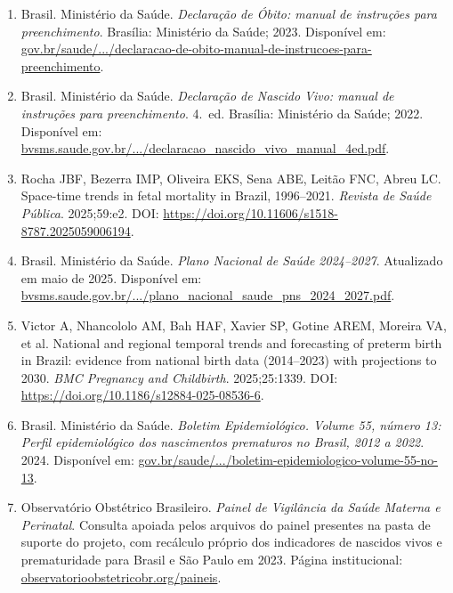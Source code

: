 \documentclass[12pt,a4paper]{article}
\begin{document}
\begin{enumerate}[leftmargin=*]
\item Brasil. Ministério da Saúde. \textit{Declaração de Óbito: manual de instruções para preenchimento}. Brasília: Ministério da Saúde; 2023. Disponível em: \href{https://www.gov.br/saude/pt-br/centrais-de-conteudo/publicacoes/svsa/vigilancia/declaracao-de-obito-manual-de-instrucoes-para-preenchimento.pdf/view}{gov.br/saude/.../declaracao-de-obito-manual-de-instrucoes-para-preenchimento}.

\item Brasil. Ministério da Saúde. \textit{Declaração de Nascido Vivo: manual de instruções para preenchimento}. 4.\ ed. Brasília: Ministério da Saúde; 2022. Disponível em: \href{https://bvsms.saude.gov.br/bvs/publicacoes/declaracao_nascido_vivo_manual_4ed.pdf}{bvsms.saude.gov.br/.../declaracao\_nascido\_vivo\_manual\_4ed.pdf}.

\item Rocha JBF, Bezerra IMP, Oliveira EKS, Sena ABE, Leitão FNC, Abreu LC. Space-time trends in fetal mortality in Brazil, 1996--2021. \textit{Revista de Saúde Pública}. 2025;59:e2. DOI: \url{https://doi.org/10.11606/s1518-8787.2025059006194}.

\item Brasil. Ministério da Saúde. \textit{Plano Nacional de Saúde 2024--2027}. Atualizado em maio de 2025. Disponível em: \href{https://bvsms.saude.gov.br/bvs/publicacoes/plano_nacional_saude_pns_2024_2027.pdf}{bvsms.saude.gov.br/.../plano\_nacional\_saude\_pns\_2024\_2027.pdf}.

\item Victor A, Nhancololo AM, Bah HAF, Xavier SP, Gotine AREM, Moreira VA, et al. National and regional temporal trends and forecasting of preterm birth in Brazil: evidence from national birth data (2014--2023) with projections to 2030. \textit{BMC Pregnancy and Childbirth}. 2025;25:1339. DOI: \url{https://doi.org/10.1186/s12884-025-08536-6}.

\item Brasil. Ministério da Saúde. \textit{Boletim Epidemiológico. Volume 55, número 13: Perfil epidemiológico dos nascimentos prematuros no Brasil, 2012 a 2022}. 2024. Disponível em: \href{https://www.gov.br/saude/pt-br/centrais-de-conteudo/publicacoes/boletins/epidemiologicos/edicoes/2024/boletim-epidemiologico-volume-55-no-13.pdf/view}{gov.br/saude/.../boletim-epidemiologico-volume-55-no-13}.

\item Observatório Obstétrico Brasileiro. \textit{Painel de Vigilância da Saúde Materna e Perinatal}. Consulta apoiada pelos arquivos do painel presentes na pasta de suporte do projeto, com recálculo próprio dos indicadores de nascidos vivos e prematuridade para Brasil e São Paulo em 2023. Página institucional: \href{https://observatorioobstetricobr.org/paineis/}{observatorioobstetricobr.org/paineis}.
\end{enumerate}
\end{document}
